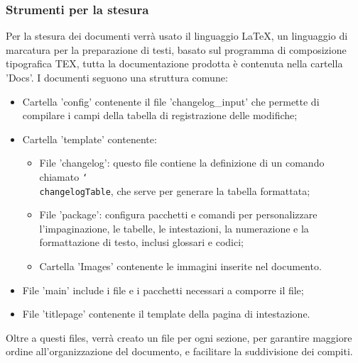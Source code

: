 \subsubsection{Strumenti per la stesura}
Per la stesura dei documenti verrà usato il linguaggio LaTeX, un linguaggio di
marcatura per la preparazione di testi, basato sul programma di composizione
tipografica TEX, tutta la documentazione prodotta è contenuta nella cartella
'Docs'. I documenti seguono una struttura comune:
\begin{itemize}
    \item Cartella 'config' contenente il file 'changelog\_input' che permette di
          compilare i campi della tabella di registrazione delle modifiche;
    \item Cartella 'template' contenente:
          \begin{itemize}
              \item File 'changelog': questo file contiene la definizione di un comando chiamato
                    \texttt{\char`\\changelogTable}, che serve per generare la tabella formattata;
              \item File 'package': configura pacchetti e comandi per personalizzare
                    l'impaginazione, le tabelle, le intestazioni, la numerazione e la formattazione
                    di testo, inclusi glossari e codici;
              \item Cartella 'Images' contenente le immagini inserite nel documento.
          \end{itemize}
    \item File 'main' include i file e i pacchetti necessari a comporre il file;
    \item File 'titlepage' contenente il template della pagina di intestazione.
\end{itemize}
Oltre a questi files, verrà creato un file per ogni sezione, per garantire maggiore ordine all'organizzazione del documento, e facilitare la suddivisione dei compiti.
